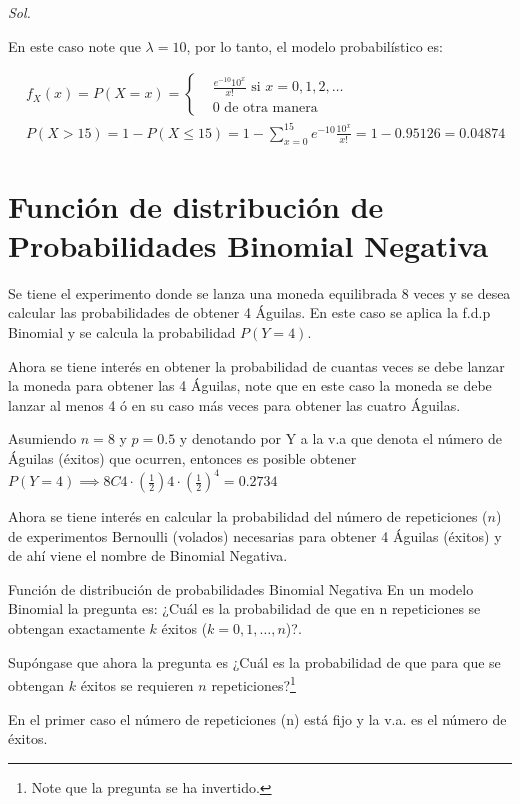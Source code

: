 \textit{ Sol. }

En este caso note que $\lambda=10$, por lo
tanto, el modelo probabilístico es:

\begin{align*}
     & f_X( x )=P(X=x )=\begin{cases}
         & \frac{e^{-10}10^x}{ x!}\text{ si } x=0,1,2,\dots \\
         & 0 \text{ de otra manera}
    \end{cases}                                   \\
     & P(X>15)=1-P(X\leq 15)=1-\sum_{x=0}^15 e^{-10}\frac{10^x}{x!}=1-0.95126=0.04874
\end{align*}

\section{Función de distribución de Probabilidades Binomial Negativa}

Se tiene el experimento donde se lanza una moneda equilibrada 8 veces y se desea calcular las probabilidades de obtener 4 Águilas. En este caso se aplica la f.d.p Binomial y se calcula la probabilidad $P(Y=4)$.

Ahora se tiene interés en obtener la probabilidad de cuantas veces se debe lanzar la moneda para obtener las 4 Águilas, note que en este caso la moneda se debe lanzar al menos 4 ó en su caso más veces para obtener las cuatro Águilas.


Asumiendo $n=8$ y $p=0.5$ y denotando por Y a la v.a que denota el número de Águilas (éxitos) que ocurren, entonces es posible obtener $P\left(Y=4\right)\implies8C4\cdot \left(\frac{1}{2}\right)4\cdot \left(\frac{1}{2}\right)^4=0.2734$

Ahora se tiene interés en calcular la probabilidad del número de repeticiones ($n$) de experimentos Bernoulli (volados) necesarias para obtener 4 Águilas (éxitos) y de ahí viene el nombre de Binomial Negativa.


Función de distribución de probabilidades Binomial Negativa  En un modelo Binomial la pregunta es: ¿Cuál es la probabilidad de que en n repeticiones se obtengan exactamente $k$ éxitos ($k=0,1,\dots,n$)?.

Supóngase que ahora la pregunta es ¿Cuál es la probabilidad de que para que se obtengan $k$ éxitos se requieren $n$ repeticiones?\footnote{Note que la pregunta se ha invertido.}


En el primer caso el número de repeticiones
(n) está fijo y la v.a. es el número de éxitos.

